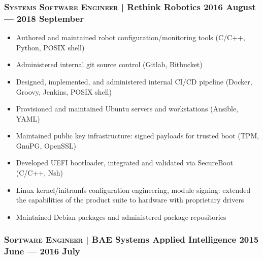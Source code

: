 \documentclass[letterpaper,10pt]{article}
\begin{document}


\subsubsection*{\textsc{Systems Software Engineer} | Rethink Robotics \hfill 2016 August --- 2018 September}

\begin{itemize}

\item
  Authored and maintained robot configuration/monitoring tools (C/C++, Python,
  POSIX shell)
\item
  Administered internal git source control (Gitlab, Bitbucket)
\item
  Designed, implemented, and administered internal CI/CD pipeline (Docker,
  Groovy, Jenkins, POSIX shell)
\item
  Provisioned and maintained Ubuntu servers and workstations (Ansible, YAML)
\item
  Maintained public key infrastructure: signed payloads for trusted boot (TPM,
  GnuPG, OpenSSL)
\item
  Developed UEFI bootloader, integrated and validated via SecureBoot (C/C++,
  Nsh)
\item
  Linux kernel/initramfs configuration engineering, module signing: extended
  the capabilities of the product suite to hardware with proprietary drivers
\item
  Maintained Debian packages and administered package repositories

\end{itemize}



\subsubsection*{\textsc{Software Engineer} | BAE Systems Applied Intelligence \hfill 2015 June --- 2016 July}
\end{document}
